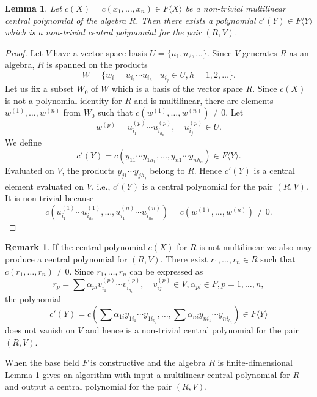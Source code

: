 \documentclass[10]{amsart}
\newtheorem{lemma}[theorem]{Lemma}
\theoremstyle{definition}
\newtheorem{remark}[theorem]{Remark}
\begin{document}
\begin{lemma}\label{the main lemma}
Let $c(X)=c(x_1,\ldots,x_n)\in F\langle X\rangle$ be a non-trivial multilinear central polynomial of the algebra $R$.
Then there exists a polynomial $c'(Y)\in F\langle Y\rangle$ which is a non-trivial central polynomial for the pair $(R,V)$.
\end{lemma}

\begin{proof}
Let $V$ have a vector space basis $U=\{u_1,u_2,\ldots\}$. Since $V$ generates $R$ as an algebra,
$R$ is spanned on the products
\[
W=\{w_i=u_{i_1}\cdots u_{i_h}\mid u_{i_j}\in U,h=1,2,\ldots\}.
\]
Let us fix a subset $W_0$ of $W$ which is a basis of the vector space $R$.
Since $c(X)$ is not a polynomial identity for $R$ and is multilinear, there are elements $w^{(1)},\ldots,w^{(n)}$ from $W_0$ such that
$c(w^{(1)},\ldots,w^{(n)})\not=0$. Let
\[
w^{(p)}=u_{i_1}^{(p)}\cdots u_{i_{h_p}}^{(p)},\quad u_{i_j}^{(p)}\in U.
\]
We define
\[
c'(Y)=c(y_{11}\cdots y_{1h_1},\ldots,y_{n1}\cdots y_{nh_n})\in F\langle Y\rangle.
\]
Evaluated on $V$, the products $y_{j1}\cdots y_{jh_j}$ belong to $R$. Hence $c'(Y)$ is a central element evaluated on $V$, i.e., $c'(Y)$
is a central polynomial for the pair $(R,V)$. It is non-trivial because
\[
c(u_{i_1}^{(1)}\cdots u_{i_{h_1}}^{(1)},\ldots,u_{i_1}^{(n)}\cdots u_{i_{h_n}}^{(n)})=c(w^{(1)},\ldots,w^{(n)})\not=0.
\]
\end{proof}

\begin{remark}\label{any central polynomial}
If the central polynomial $c(X)$ for $R$ is not multilinear we also may produce a central polynomial for $(R,V)$.
There exist $r_1,\ldots,r_n\in R$ such that $c(r_1,\ldots,r_n)\not=0$. Since $r_1,\ldots,r_n$ can be expressed as
\[
r_p=\sum\alpha_{pi}v_{i_1}^{(p)}\cdots v_{i_{h_i}}^{(p)},\quad v_{ij}^{(p)}\in V,\alpha_{pi}\in F,p=1,\ldots,n,
\]
the polynomial
\[
c'(Y)=c(\sum\alpha_{1i}y_{1i_1}\cdots y_{1i_{h_i}},\ldots,\sum\alpha_{ni}y_{ni_1}\cdots y_{ni_{h_i}})\in F\langle Y\rangle
\]
does not vanish on $V$ and hence is a non-trivial central polynomial for the pair $(R,V)$.
\end{remark}

When the base field $F$ is constructive and the algebra $R$ is finite-dimensional Lemma \ref{the main lemma} gives an algorithm
with input a multilinear central polynomial for $R$ and output a central polynomial for the pair $(R,V)$.
\end{document}
